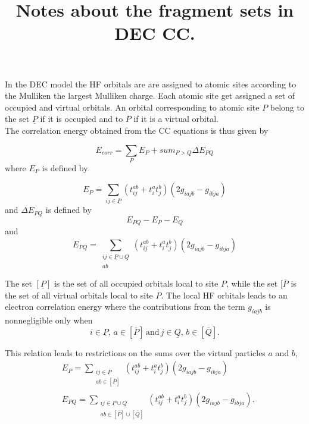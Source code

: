 \documentclass[12pt,a4paper,english]{article}
\title{Notes about the fragment sets in DEC CC.}
\date{}
\begin{document}
 In
the DEC model the HF orbitals are are assigned to atomic sites according to the
Mulliken the largest Mulliken charge. Each atomic site get assigned a set of
occupied and virtual orbitals.  An orbital corresponding to atomic site $P$
belong to the set $\underline P$ if it is occupied and to $\overline P$ if it is a
virtual orbital. \\

The correlation energy obtained from the CC equations is thus given by

\begin{equation}
  E_{corr}=\sum_{P} E_P +sum_{P>Q}\Delta E_{PQ}
  \label{eq:cccorrPQ}
\end{equation}
where $E_P$ is defined by

\begin{equation}
  E_P=\sum_{ij\in \underline P} (t^{ab}_{ij}+t^a_it^b_j)(2g_{iajb}-g_{ibja})
  \label{eq:EP}
\end{equation}
and $\Delta E_{PQ}$ is defined by
\begin{equation}
  E_{PQ}-E_P-E_Q
  \label{eq:DEPQ}
\end{equation}
and 
\begin{equation}
  E_{PQ}=\sum_{\substack{ij \in \underline P \cup \underline Q \\ab}} (t^{ab}_{ij}+t^a_it^b_j)(2g_{iajb}-g_{ibja})
  \label{eq:EPQ}
\end{equation}

The set $[\underline{P}]$ is the set of all occupied orbitals local to site $P$, while the set $[\overline{P}$ is the set of all virtual orbitals local to site $P$.
  The local HF orbitals leads to an electron correlation energy where the contributions from the term $g_{iajb}$ is nonnegligible only when 
  \begin{equation}
	i\in \underline{P},\, a\in [\overline{P}]\, \mbox{and}\, j\in \underline{Q},\, b\in [\overline{Q}].
	\label{eq:critnonneg}
  \end{equation}

This relation leads to restrictions on the sums over the virtual particles $a$ and $b$,
\begin{equation}
  \begin{split}
  & E_P=\sum_{\substack{ij\in \underline{P}\\ab\in [\overline{P}]}}(t^{ab}_{ij}+t^a_it^b_j)(2g_{iajb}-g_{ibja})\\
  & E_{PQ}=\sum_{\substack{ij\in \underline{P}\cup \underline{Q}\\ab\in [\overline{P}]\cup [\overline{Q}]}}(t^{ab}_{ij}+t^a_it^b_j)(2g_{iajb}-g_{ibja}).
\end{split}
  \label{eq:restEP}
\end{equation}
\end{document}
